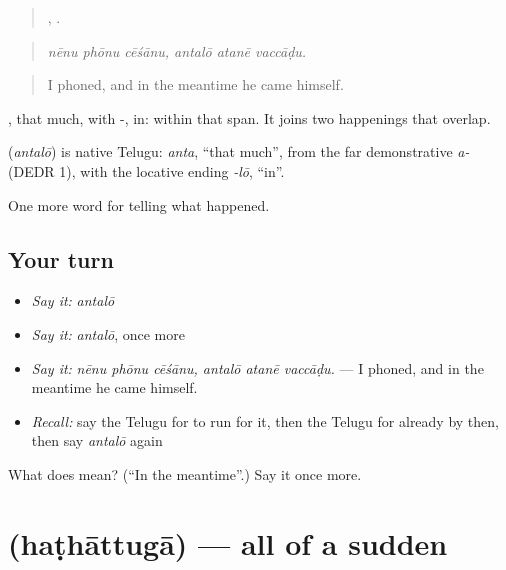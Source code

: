 \begin{quote}
  ,   .
\end{quote}

\begin{quote}
\emph{nēnu phōnu cēśānu, antalō atanē vaccāḍu.}
\end{quote}

\begin{quote}
I phoned, and in the meantime he came himself.
\end{quote}

, that much, with -, in: within that span. It joins two happenings that overlap.

\begin{cousinweb}
\textbf{} (\emph{antalō}) is native Telugu: \emph{anta}, \textquotedblleft{}that much\textquotedblright{}, from the far demonstrative \emph{a-} (DEDR 1), with the locative ending \emph{-lō}, \textquotedblleft{}in\textquotedblright{}.
\end{cousinweb}

\begin{grammarlens}[title={What you've built}]
One more word for telling what happened.
\end{grammarlens}

\subsection*{Your turn}
\begin{itemize}
\raggedright
  \item \emph{Say it:} \emph{antalō}
  \item \emph{Say it:} \emph{antalō}, once more
  \item \emph{Say it:} \emph{nēnu phōnu cēśānu, antalō atanē vaccāḍu.} — I phoned, and in the meantime he came himself.
  \item \emph{Recall:} say the Telugu for to run for it, then the Telugu for already by then, then say \emph{antalō} again
\end{itemize}

\begin{tcolorbox}[breakable,colback=teal!4,colframe=teal!35!black,title={Before you move on}]
What does  mean? (\textquotedblleft{}In the meantime\textquotedblright{}.) Say it once more.
\end{tcolorbox}
\section[\texorpdfstring{\te{హఠాత్తుగా} (haṭhāttugā)}{హఠాత్తుగా (haṭhāttugā)}]{ (haṭhāttugā) — all of a sudden}

